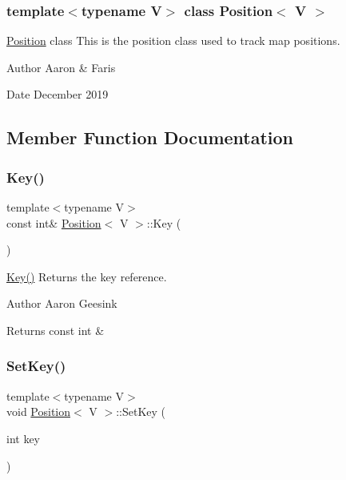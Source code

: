 \subsubsection*{template$<$typename V$>$\newline
class Position$<$ V $>$}

\mbox{\hyperlink{class_position}{Position}} class This is the position class used to track map positions. 

\begin{DoxyAuthor}{Author}
Aaron \& Faris 
\end{DoxyAuthor}
\begin{DoxyDate}{Date}
December 2019 
\end{DoxyDate}


\subsection{Member Function Documentation}
\mbox{\label{class_position_a0ba88e33f79d95d77e9761a2b71a1ae9}} 
\subsubsection{\texorpdfstring{Key()}{Key()}}
{\footnotesize\ttfamily template$<$typename V$>$ \\
const int\& \mbox{\hyperlink{class_position}{Position}}$<$ V $>$\+::Key (\begin{DoxyParamCaption}{ }\end{DoxyParamCaption})\hspace{0.3cm}{\ttfamily [inline]}}



\mbox{\hyperlink{class_position_a0ba88e33f79d95d77e9761a2b71a1ae9}{Key()}} Returns the key reference. 

\begin{DoxyAuthor}{Author}
Aaron Geesink 
\end{DoxyAuthor}
\begin{DoxyReturn}{Returns}
const int \& 
\end{DoxyReturn}
\mbox{\label{class_position_a7605869eac2d7796bab440c7ff306a2d}} 
\subsubsection{\texorpdfstring{SetKey()}{SetKey()}}
{\footnotesize\ttfamily template$<$typename V$>$ \\
void \mbox{\hyperlink{class_position}{Position}}$<$ V $>$\+::Set\+Key (\begin{DoxyParamCaption}\item[{int}]{key }\end{DoxyParamCaption})\hspace{0.3cm}{\ttfamily [inline]}}



